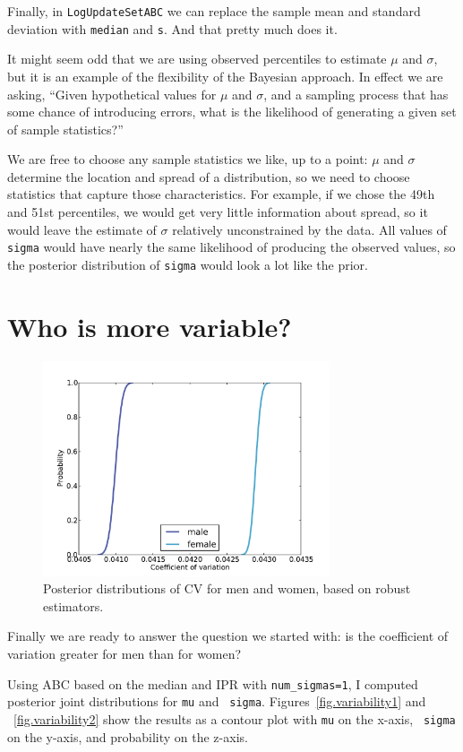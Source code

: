 \documentclass[12pt]{book}
\theoremstyle{exercise}
\begin{document}
Finally, in {\tt LogUpdateSetABC} we can replace the sample mean and
standard deviation with {\tt median} and {\tt s}.  And that pretty
much does it.

It might seem odd that we are using observed percentiles to
estimate $\mu$ and $\sigma$, but it is an example of the
flexibility of the Bayesian approach.  In effect we are asking,
``Given hypothetical values for $\mu$ and $\sigma$, and
a sampling process that has some chance of introducing errors,
what is the likelihood of generating a given set of sample
statistics?''

We are free to choose any sample statistics we like, up to a point:
$\mu$ and $\sigma$ determine the location and spread of
a distribution, so we need to choose statistics that capture those
characteristics.  For example, if we chose the 49th and 51st percentiles,
we would get very little information about spread, so it
would leave the estimate of $\sigma$ relatively unconstrained
by the data.  All values of {\tt sigma} would have nearly the
same likelihood of producing the observed values, so the posterior
distribution of {\tt sigma} would look a lot like the
prior.


\section{Who is more variable?}

\begin{figure}
\centerline{\includegraphics[height=2.5in]{figs/variability_cv.pdf}}
\caption{Posterior distributions of CV for men and women, based on
robust estimators.}
\label{fig.variability3}
\end{figure}

Finally we are ready to answer the question we started with: is the
coefficient of variation greater for men than for women?

Using ABC based on the median and IPR with \verb"num_sigmas=1", I
computed posterior joint distributions for {\tt mu} and {\tt
  sigma}.  Figures~\ref{fig.variability1} and ~\ref{fig.variability2}
show the results as a contour plot with {\tt mu} on the x-axis, {\tt
  sigma} on the y-axis, and probability on the z-axis.
\end{document}
